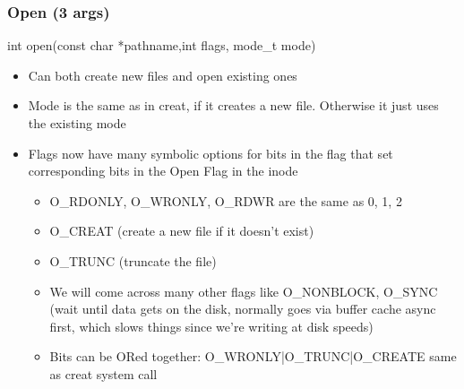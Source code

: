 \subsubsection{Open (3 args)}
int open(const char *pathname,int flags, mode\_t mode)
\begin{itemize}
    \item Can both create new files and open existing ones
    \item Mode is the same as in creat, if it creates a new file. Otherwise it just uses the existing mode
    \item Flags now have many symbolic options for bits in the flag that set corresponding bits in the Open Flag in the inode
    \begin{itemize}
        \item O\_RDONLY, O\_WRONLY, O\_RDWR are the same as 0, 1, 2
        \item O\_CREAT (create a new file if it doesn't exist)
        \item O\_TRUNC (truncate the file)
        \item We will come across many other flags like O\_NONBLOCK, O\_SYNC (wait until data gets on the disk, normally goes via buffer cache async first, which slows things since we're writing at disk speeds)
        \item Bits can be ORed together: O\_WRONLY|O\_TRUNC|O\_CREATE same as creat system call
    \end{itemize}
\end{itemize}

